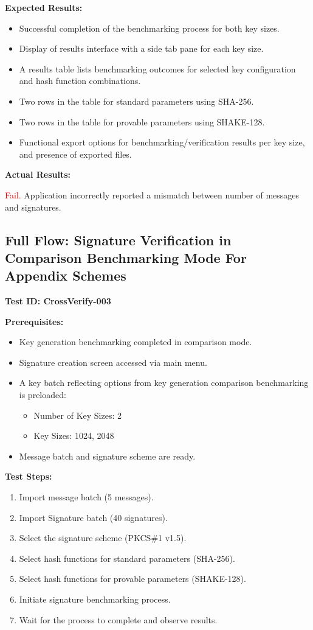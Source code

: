 \documentclass[]{final_report}
\theoremstyle{definition}
\begin{document}
\textbf{Expected Results:}
\begin{itemize}
    \item Successful completion of the benchmarking process for both key sizes.
    \item Display of results interface with a side tab pane for each key size.
    \item A results table lists benchmarking outcomes for selected key configuration and hash function combinations.
    \item Two rows in the table for standard parameters using SHA-256.
    \item Two rows in the table for provable parameters using SHAKE-128.
    \item Functional export options for benchmarking/verification results per key size, and presence of exported files.
\end{itemize}

\textbf{Actual Results:}

 \textcolor{red}{Fail.} Application incorrectly reported a mismatch between number of messages and signatures.

\subsection*{Full Flow: Signature Verification in Comparison Benchmarking Mode For Appendix Schemes}

\textbf{Test ID: CrossVerify-003}

\textbf{Prerequisites:}
\begin{itemize}
    \item Key generation benchmarking completed in comparison mode.
    \item Signature creation screen accessed via main menu.
    \item A key batch reflecting options from key generation comparison benchmarking is preloaded:
    \begin{itemize}
        \item Number of Key Sizes: 2
        \item Key Sizes: 1024, 2048
    \end{itemize}
    \item Message batch and signature scheme are ready.
\end{itemize}

\textbf{Test Steps:}
\begin{enumerate}
    \item Import message batch (5 messages).
     \item Import Signature batch (40 signatures).
    \item Select the signature scheme (PKCS\#1 v1.5).
    \item Select hash functions for standard parameters (SHA-256).
    \item Select hash functions for provable parameters (SHAKE-128).
    \item Initiate signature benchmarking process.
    \item Wait for the process to complete and observe results.
\end{enumerate}
\end{document}
